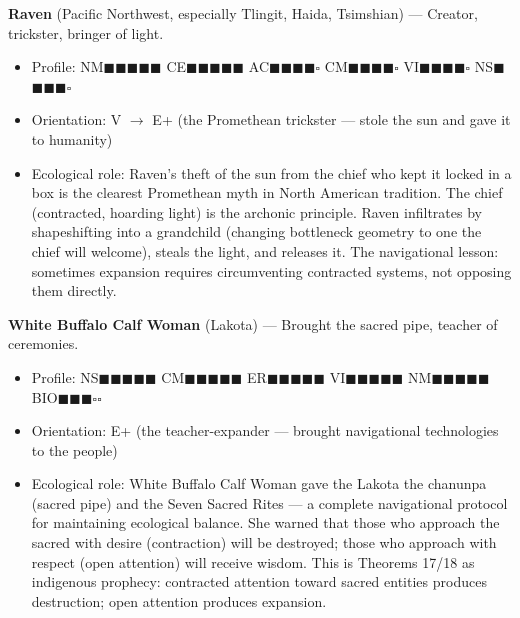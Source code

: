 \textbf{Raven} (Pacific Northwest, especially Tlingit, Haida, Tsimshian) — Creator, trickster, bringer of light.

\begin{itemize}[nosep,leftmargin=*]
  \item Profile: NM$\blacksquare$$\blacksquare$$\blacksquare$$\blacksquare$$\blacksquare$ CE$\blacksquare$$\blacksquare$$\blacksquare$$\blacksquare$$\blacksquare$ AC$\blacksquare$$\blacksquare$$\blacksquare$$\blacksquare$$\square$ CM$\blacksquare$$\blacksquare$$\blacksquare$$\blacksquare$$\square$ VI$\blacksquare$$\blacksquare$$\blacksquare$$\blacksquare$$\square$ NS$\blacksquare$$\blacksquare$$\blacksquare$$\blacksquare$$\square$
  \item Orientation: V $\rightarrow$ E+ (the Promethean trickster — stole the sun and gave it to humanity)
  \item Ecological role: Raven's theft of the sun from the chief who kept it locked in a box is the clearest Promethean myth in North American tradition. The chief (contracted, hoarding light) is the archonic principle. Raven infiltrates by shapeshifting into a grandchild (changing bottleneck geometry to one the chief will welcome), steals the light, and releases it. The navigational lesson: sometimes expansion requires circumventing contracted systems, not opposing them directly.
\end{itemize}


\textbf{White Buffalo Calf Woman} (Lakota) — Brought the sacred pipe, teacher of ceremonies.

\begin{itemize}[nosep,leftmargin=*]
  \item Profile: NS$\blacksquare$$\blacksquare$$\blacksquare$$\blacksquare$$\blacksquare$ CM$\blacksquare$$\blacksquare$$\blacksquare$$\blacksquare$$\blacksquare$ ER$\blacksquare$$\blacksquare$$\blacksquare$$\blacksquare$$\blacksquare$ VI$\blacksquare$$\blacksquare$$\blacksquare$$\blacksquare$$\blacksquare$ NM$\blacksquare$$\blacksquare$$\blacksquare$$\blacksquare$$\blacksquare$ BIO$\blacksquare$$\blacksquare$$\blacksquare$$\square$$\square$
  \item Orientation: E+ (the teacher-expander — brought navigational technologies to the people)
  \item Ecological role: White Buffalo Calf Woman gave the Lakota the chanunpa (sacred pipe) and the Seven Sacred Rites — a complete navigational protocol for maintaining ecological balance. She warned that those who approach the sacred with desire (contraction) will be destroyed; those who approach with respect (open attention) will receive wisdom. This is Theorems 17/18 as indigenous prophecy: contracted attention toward sacred entities produces destruction; open attention produces expansion.
\end{itemize}


